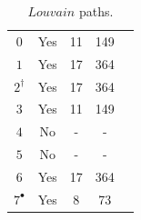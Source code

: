 \begin{table}[thbp]
{\begin{tabular}{c|c|c|c|c}
			\midrule
			$0$ & Yes  &  11 & 149 \\	
			$1$ & Yes & 17 & 364  \\	
			$2^{\dagger}$ & Yes & 17 & 364 \\
			$3$ & Yes & 11  & 149  \\
			$4$ & No & - & - \\
			$5$ & No & -  & - \\	
			$6$ & Yes & 17 & 364 \\
			$7^{\bullet}$ & Yes & 8  & 73  \\		
			\bottomrule
		\end{tabular}
		\caption{\boldmath$Louvain$ paths.}
		\label{Table:Check;Louvain}
	}
	
\end{table}
